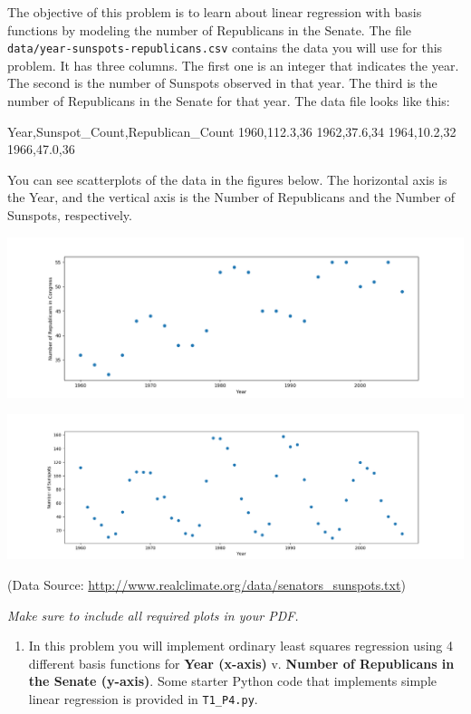 \documentclass[submit]{harvardml}
\begin{document}
\begin{problem}
  
 The objective of this problem is to learn about linear regression
 with basis functions by modeling the number of Republicans in the
 Senate. The file \verb|data/year-sunspots-republicans.csv| contains the
 data you will use for this problem.  It has three columns.  The first
 one is an integer that indicates the year.  The second is the number
 of Sunspots observed in that year.  The third is the number of Republicans in the Senate for that year.
 The data file looks like this:
 \begin{csv}
Year,Sunspot_Count,Republican_Count
1960,112.3,36
1962,37.6,34
1964,10.2,32
1966,47.0,36
\end{csv}

You can see scatterplots of the data in the figures below.  The horizontal axis is the Year, and the vertical axis is the Number of Republicans and the Number of Sunspots, respectively.

\begin{center}
\includegraphics[width=.5\textwidth]{data/year-republicans}
\end{center}

\begin{center}
\includegraphics[width=.5\textwidth]{data/year-sunspots}
\end{center}

(Data Source: \url{http://www.realclimate.org/data/senators_sunspots.txt})\\
\vspace{-5mm}


\vspace{0.5cm}
\noindent\emph{Make sure to include all required plots in your PDF.}

\begin{enumerate}

\item In this problem you will implement ordinary least squares
  regression using 4 different basis functions for \textbf{Year
    (x-axis)} v. \textbf{Number of Republicans in the Senate
    (y-axis)}. Some starter Python code that implements simple linear
  regression is provided in \verb|T1_P4.py|.


\end{enumerate}
\end{problem}
\end{document}
